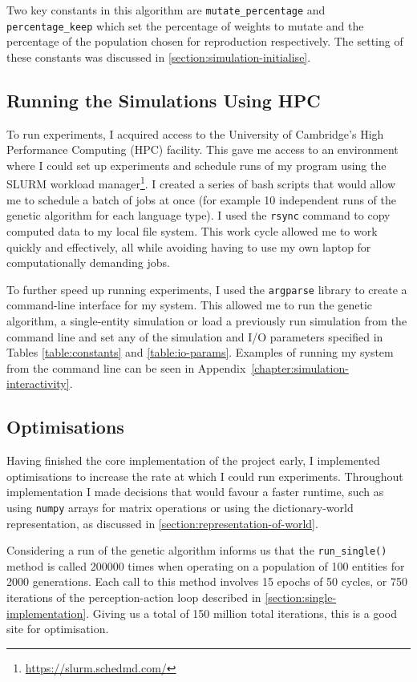 \documentclass[12pt,a4paper]{report}
\begin{document}
Two key constants in this algorithm are \texttt{mutate\_percentage} and \texttt{percentage\_keep} which set the percentage of weights to mutate and the percentage of the population chosen for reproduction respectively. The setting of these constants was discussed in \cref{section:simulation-initialise}.

\subsection{Running the Simulations Using HPC}\label{section:running}

To run experiments, I acquired access to the University of Cambridge's High Performance Computing (HPC) facility. This gave me access to an environment where I could set up experiments and schedule runs of my program using the SLURM workload manager\footnote{\url{https://slurm.schedmd.com/}}. I created a series of bash scripts that would allow me to schedule a batch of jobs at once (for example 10 independent runs of the genetic algorithm for each language type). I used the \texttt{rsync} command to copy computed data to my local file system. This work cycle allowed me to work quickly and effectively, all while avoiding having to use my own laptop for computationally demanding jobs. 

To further speed up running experiments, I used the \texttt{argparse} library to create a command-line interface for my system. This allowed me to run the genetic algorithm, a single-entity simulation or load a previously run simulation from the command line and set any of the simulation and I/O parameters specified in Tables \ref{table:constants} and \ref{table:io-params}. Examples of running my system from the command line can be seen in Appendix~\ref{chapter:simulation-interactivity}.

\subsection{Optimisations}\label{section:optimisations}

Having finished the core implementation of the project early, I implemented optimisations to increase the rate at which I could run experiments. Throughout implementation I made decisions that would favour a faster runtime, such as using \verb|numpy| arrays for matrix operations or using the dictionary-world representation, as discussed in \cref{section:representation-of-world}.

Considering a run of the genetic algorithm informs us that the \texttt{run\_single()} method is called 200000 times when operating on a population of 100 entities for 2000 generations. Each call to this method involves 15 epochs of 50 cycles, or 750 iterations of the perception-action loop described in \cref{section:single-implementation}. Giving us a total of 150 million total iterations, this is a good site for optimisation.
\end{document}
